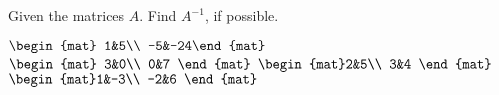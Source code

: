 
\begin{Exercise}[
name={},
title={}, 
difficulty=0,
origin={\cite{GH}}]
Given the matrices $A$. Find $A^{-1}$, if possible.
\begin{multicols}{2}
\Question $\begin{mat} 1&5\\  -5&-24\end{mat}$
\Question $\begin{mat} 3&0\\  0&7 \end{mat}$
\Question $\begin{mat}2&5\\  3&4 \end{mat}$
\Question $\begin{mat}1&-3\\  -2&6 \end{mat}$
\EndCurrentQuestion
\end{multicols}

\end{Exercise}
